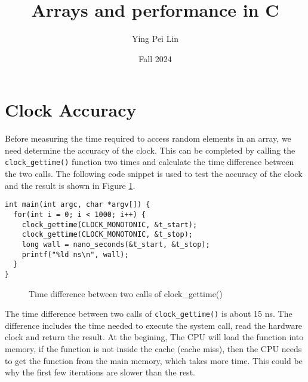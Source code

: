 \documentclass[a4paper,11pt]{article}
\begin{document}
\title{
    \textbf{Arrays and performance in C}
}
\author{Ying Pei Lin}
\date{Fall 2024}

\maketitle

\section*{Clock Accuracy}

Before measuring the time required to access random elements in an array, we need determine the 
accuracy of the clock. This can be completed by calling the {\tt clock\_gettime()} function two times and 
calculate the time difference between the two calls. The following code snippet is used to test the accuracy 
of the clock and the result is shown in Figure \ref{fig:clock_accuracy}. 

\begin{verbatim}
int main(int argc, char *argv[]) {
  for(int i = 0; i < 1000; i++) {
    clock_gettime(CLOCK_MONOTONIC, &t_start);
    clock_gettime(CLOCK_MONOTONIC, &t_stop);
    long wall = nano_seconds(&t_start, &t_stop);
    printf("%ld ns\n", wall); 
  }
}
\end{verbatim}

\begin{figure}[H]
  \centering
  \caption{Time difference between two calls of clock\_gettime()}
  \label{fig:clock_accuracy}
\end{figure}

The time difference between two calls of {\tt clock\_gettime()} is about 15 ns. The difference
includes the time needed to execute the system call, read the hardware clock and return the result. 
At the begining, The CPU will load the function into memory, if the function 
is not inside the cache (cache miss), then the CPU needs to get the function from the main memory, 
which takes more time. This could be why the first few iterations are slower than the rest.
\end{document}
